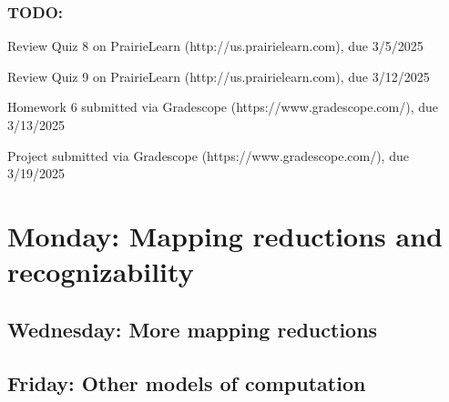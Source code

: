 \vspace{-20pt}

\subsubsection*{TODO:}
\begin{list}{\itemsep-10pt}
   \item Review Quiz 8 on PrairieLearn (http://us.prairielearn.com), due 3/5/2025
   \item Review Quiz 9 on PrairieLearn (http://us.prairielearn.com), due 3/12/2025
   \item Homework 6 submitted via Gradescope (https://www.gradescope.com/), due 3/13/2025
   \item Project submitted via Gradescope (https://www.gradescope.com/), due 3/19/2025
\end{list}

\newpage

\section*{Monday: Mapping reductions and recognizability}


    
\newpage
\subsection*{Wednesday: More mapping reductions}




\vfill
\subsection*{Friday: Other models of computation}


\newpage
